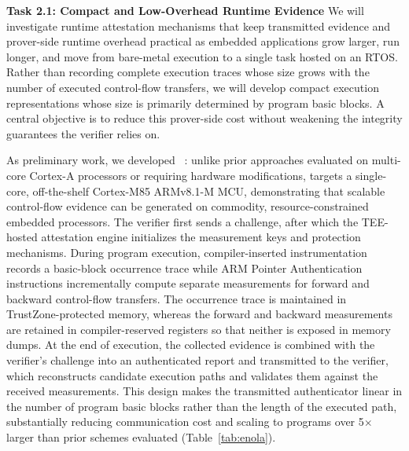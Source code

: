 \textbf{Task 2.1: Compact and Low-Overhead Runtime Evidence}
We will investigate runtime attestation mechanisms that keep transmitted evidence and prover-side runtime overhead practical as embedded applications grow larger, run longer, and move from bare-metal execution to a single task hosted on an RTOS.
Rather than recording complete execution traces whose size grows with the number of executed control-flow transfers, we will develop compact execution representations whose size is primarily determined by program basic blocks.
A central objective is to reduce this prover-side cost without weakening the integrity guarantees the verifier relies on.


As preliminary work, we developed \enola~\cite{armanuzzaman2026enola}: unlike prior approaches evaluated on multi-core Cortex-A processors or requiring hardware modifications, \enola targets a single-core, off-the-shelf Cortex-M85 ARMv8.1-M MCU, demonstrating that scalable control-flow evidence can be generated on commodity, resource-constrained embedded processors.
The verifier first sends a challenge, after which the TEE-hosted \enola attestation engine initializes the measurement keys and protection mechanisms.
During program execution, compiler-inserted instrumentation records a basic-block occurrence trace while ARM Pointer Authentication instructions incrementally compute separate measurements for forward and backward control-flow transfers.
The occurrence trace is maintained in TrustZone-protected memory, whereas the forward and backward measurements are retained in compiler-reserved registers so that neither is exposed in memory dumps.
At the end of execution, the collected evidence is combined with the verifier's challenge into an authenticated report and transmitted to the verifier, which reconstructs candidate execution paths and validates them against the received measurements.
This design makes the transmitted authenticator linear in the number of program basic blocks rather than the length of the executed path, substantially reducing communication cost and scaling to programs over 5$\times$ larger than prior schemes evaluated (Table~\ref{tab:enola}).

